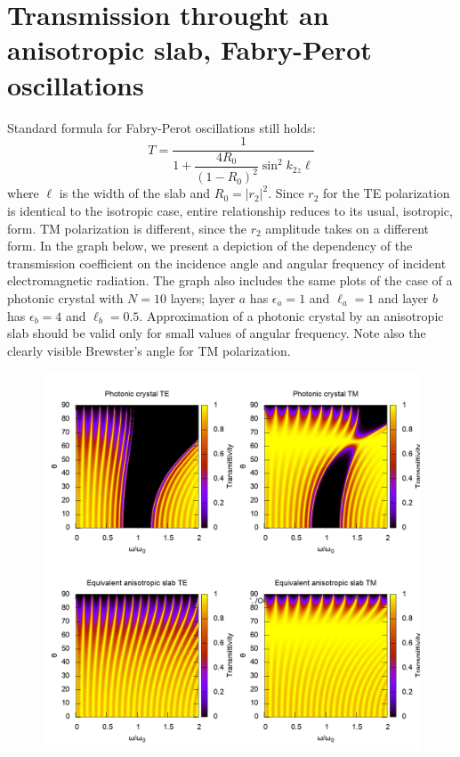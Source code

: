 \documentclass[a4paper]{scrartcl}
\begin{document}
\section{Transmission throught an anisotropic slab, Fabry-Perot oscillations}
Standard formula for Fabry-Perot oscillations still holds:
\begin{equation}
      T = \dfrac{1}{1 + \dfrac{4R_0}{(1-R_0)^2}\sin^2 k_{2z} \ell}
\end{equation}
where $\ell$ is the width of the slab and $R_0 = \left|r_2\right|^2$. Since $r_2$ for the TE polarization is identical
to the isotropic case, entire relationship reduces to its usual, isotropic, form. TM polarization is different, since
the $r_2$ amplitude takes on a different form. In the graph below, we present a depiction of the dependency of the
transmission coefficient on the incidence angle and angular frequency of incident electromagnetic radiation. The graph
also includes the same plots of the case of a photonic crystal with $N=10$ layers; layer $a$ has $\epsilon_a=1$ and
$\ell_a=1$ and layer $b$ has $\epsilon_b = 4$ and $\ell_b = 0.5$. Approximation of a photonic crystal by an anisotropic
slab should be valid only for small values of angular frequency. Note also the clearly visible Brewster's angle for TM
polarization.
\begin{figure}[b!]
\centering
\includegraphics[width=0.90\linewidth]{../Fabry-Perot/Pics/Compare.png}
\end{figure}
\end{document}
